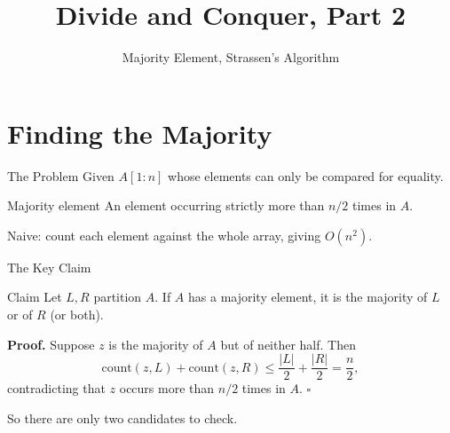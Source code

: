 \documentclass[10pt,aspectratio=169]{beamer}
\title{Divide and Conquer, Part 2}
\subtitle{Majority Element, Strassen's Algorithm}
\date{}
\author{}
\begin{document}
\maketitle

\section{Finding the Majority}

\begin{frame}{The Problem}
  Given $A[1:n]$ whose elements can only be \alert{compared for equality}.

  \bigskip
  \begin{block}{Majority element}
    An element occurring \alert{strictly more than $n/2$ times} in $A$.
  \end{block}

  \bigskip
  \begin{center}
  \end{center}

  \bigskip
  \begin{center}
    Naive: count each element against the whole array, giving $O(n^2)$.
  \end{center}
\end{frame}

\begin{frame}{The Key Claim}
  \begin{block}{Claim}
    Let $L, R$ partition $A$. If $A$ has a majority element,
    it is the majority of \alert{$L$ or of $R$} (or both).
  \end{block}

  \bigskip
  \textbf{Proof.} Suppose $z$ is the majority of $A$ but of neither half. Then
  \[
    \text{count}(z, L) + \text{count}(z, R) \le \frac{|L|}{2} + \frac{|R|}{2} = \frac{n}{2},
  \]
  contradicting that $z$ occurs more than $n/2$ times in $A$. $\square$

  \bigskip
  \begin{center}
    So there are only \alert{two candidates} to check.
  \end{center}
\end{frame}
\end{document}

